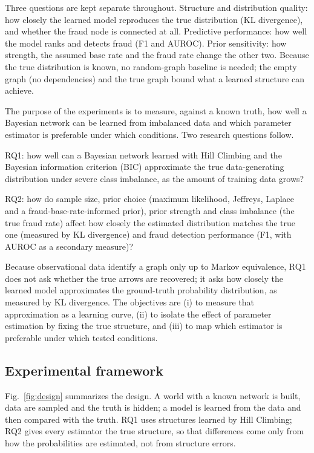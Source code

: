 \documentclass[final,5p,times,authoryear]{elsarticle}
\begin{document}
Three questions are kept separate throughout. Structure and distribution quality: how closely the learned model reproduces the true distribution (KL divergence), and whether the fraud node is connected at all. Predictive performance: how well the model ranks and detects fraud (F1 and AUROC). Prior sensitivity: how strength, the assumed base rate and the fraud rate change the other two. Because the true distribution is known, no random-graph baseline is needed; the empty graph (no dependencies) and the true graph bound what a learned structure can achieve.

The purpose of the experiments is to measure, against a known truth, how well a Bayesian network can be learned from imbalanced data and which parameter estimator is preferable under which conditions. Two research questions follow.

RQ1: how well can a Bayesian network learned with Hill Climbing and the Bayesian information criterion (BIC) approximate the true data-generating distribution under severe class imbalance, as the amount of training data grows?

RQ2: how do sample size, prior choice (maximum likelihood, Jeffreys, Laplace and a fraud-base-rate-informed prior), prior strength and class imbalance (the true fraud rate) affect how closely the estimated distribution matches the true one (measured by KL divergence) and fraud detection performance (F1, with AUROC as a secondary measure)?

Because observational data identify a graph only up to Markov equivalence, RQ1 does not ask whether the true arrows are recovered; it asks how closely the learned model approximates the ground-truth probability distribution, as measured by KL divergence. The objectives are (i) to measure that approximation as a learning curve, (ii) to isolate the effect of parameter estimation by fixing the true structure, and (iii) to map which estimator is preferable under which tested conditions.

\subsection{Experimental framework}
Fig.~\ref{fig:design} summarizes the design. A world with a known network is built, data are sampled and the truth is hidden; a model is learned from the data and then compared with the truth. RQ1 uses structures learned by Hill Climbing; RQ2 gives every estimator the true structure, so that differences come only from how the probabilities are estimated, not from structure errors.
\end{document}
